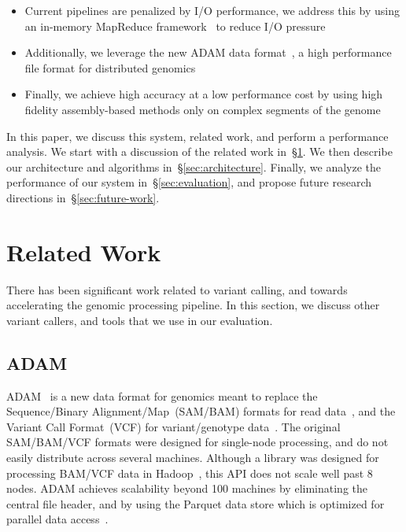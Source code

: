 \documentclass{acm_proc_article-sp}
\begin{document}
\begin{itemize}
\item Current pipelines are penalized by I/O performance, we address this by using an in-memory MapReduce framework~\cite{zaharia10}
to reduce I/O pressure
\item Additionally, we leverage the new ADAM data format~\cite{massie13}, a high performance file format for distributed genomics
\item Finally, we achieve high accuracy at a low performance cost by using high fidelity assembly-based methods only on complex
segments of the genome
\end{itemize}

In this paper, we discuss this system, related work, and perform a performance analysis. We start with a discussion of the related work
in~\S\ref{sec:related-work}. We then describe our architecture and algorithms in~\S\ref{sec:architecture}. Finally, we analyze the performance
of our system in~\S\ref{sec:evaluation}, and propose future research directions in~\S\ref{sec:future-work}.

\section{Related Work}
\label{sec:related-work}

There has been significant work related to variant calling, and towards accelerating the genomic processing pipeline. In this section, we
discuss other variant callers, and tools that we use in our evaluation.

\subsection{ADAM}
\label{sec:adam}


ADAM~\cite{massie13} is a new data format for genomics meant to replace the Sequence/Binary Alignment/Map~(SAM/BAM) formats for read
data~\cite{li09sam}, and the Variant Call Format~(VCF) for variant/genotype data~\cite{danecek11}. The original SAM/BAM/VCF formats were
designed for single-node processing, and do not easily distribute across several machines. Although a library was designed for processing
BAM/VCF data in Hadoop~\cite{niemenmaa12}, this API does not scale well past 8 nodes. ADAM achieves scalability beyond 100 machines
by eliminating the central file header, and by using the Parquet data store which is optimized for parallel data access~\cite{parquet}.
\end{document}
